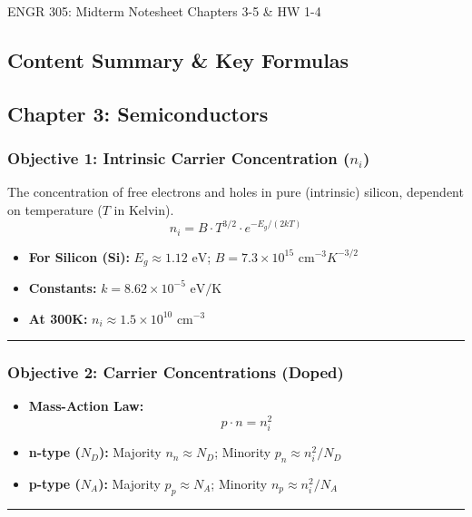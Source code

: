 \documentclass[10pt]{article}
\begin{document}
ENGR 305: Midterm Notesheet \hfill Chapters 3-5 \& HW 1-4 \hfill

\begin{multicols}{2}

\section*{Content Summary \& Key Formulas}

\subsection*{Chapter 3: Semiconductors}

\subsubsection*{Objective 1: Intrinsic Carrier Concentration ($n_i$)}
The concentration of free electrons and holes in pure (intrinsic) silicon, dependent on temperature ($T$ in Kelvin).
\[ n_i = B \cdot T^{3/2} \cdot e^{-E_g / (2 k T)} \]
\begin{itemize}
    \item \textbf{For Silicon (Si):} $E_g \approx 1.12 \text{ eV}$; $B = 7.3 \times 10^{15} \text{ cm}^{-3}K^{-3/2}$
    \item \textbf{Constants:} $k = 8.62 \times 10^{-5} \text{ eV/K}$
    \item \textbf{At 300K:} $n_i \approx 1.5 \times 10^{10} \text{ cm}^{-3}$
\end{itemize}

\hrule

\subsubsection*{Objective 2: Carrier Concentrations (Doped)}
\begin{itemize}
    \item \textbf{Mass-Action Law:} \[ p \cdot n = n_i^2 \]
    \item \textbf{n-type ($N_D$):} Majority \( n_n \approx N_D \); Minority \( p_n \approx n_i^2 / N_D \)
    \item \textbf{p-type ($N_A$):} Majority \( p_p \approx N_A \); Minority \( n_p \approx n_i^2 / N_A \)
\end{itemize}

\hrule


\end{multicols}
\end{document}
